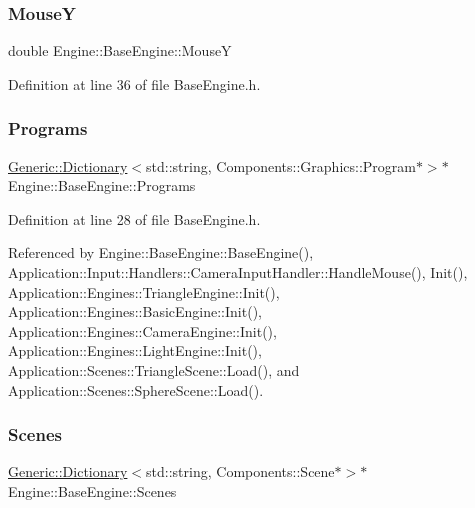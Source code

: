 \subsubsection{\texorpdfstring{MouseY}{MouseY}}
{\footnotesize\ttfamily double Engine\+::\+Base\+Engine\+::\+MouseY\hspace{0.3cm}{\ttfamily [inherited]}}



Definition at line 36 of file Base\+Engine.\+h.

\mbox{\label{classEngine_1_1BaseEngine_ae0f86360ea3a384caefe443dd8f88601}} 
\subsubsection{\texorpdfstring{Programs}{Programs}}
{\footnotesize\ttfamily \mbox{\hyperlink{classGeneric_1_1Dictionary}{Generic\+::\+Dictionary}}$<$std\+::string, Components\+::\+Graphics\+::\+Program$\ast$$>$$\ast$ Engine\+::\+Base\+Engine\+::\+Programs\hspace{0.3cm}{\ttfamily [inherited]}}



Definition at line 28 of file Base\+Engine.\+h.



Referenced by Engine\+::\+Base\+Engine\+::\+Base\+Engine(), Application\+::\+Input\+::\+Handlers\+::\+Camera\+Input\+Handler\+::\+Handle\+Mouse(), Init(), Application\+::\+Engines\+::\+Triangle\+Engine\+::\+Init(), Application\+::\+Engines\+::\+Basic\+Engine\+::\+Init(), Application\+::\+Engines\+::\+Camera\+Engine\+::\+Init(), Application\+::\+Engines\+::\+Light\+Engine\+::\+Init(), Application\+::\+Scenes\+::\+Triangle\+Scene\+::\+Load(), and Application\+::\+Scenes\+::\+Sphere\+Scene\+::\+Load().

\mbox{\label{classEngine_1_1BaseEngine_afd02af3c2fbe9bb734db014dec06585a}} 
\subsubsection{\texorpdfstring{Scenes}{Scenes}}
{\footnotesize\ttfamily \mbox{\hyperlink{classGeneric_1_1Dictionary}{Generic\+::\+Dictionary}}$<$std\+::string, Components\+::\+Scene$\ast$$>$$\ast$ Engine\+::\+Base\+Engine\+::\+Scenes\hspace{0.3cm}{\ttfamily [inherited]}}



